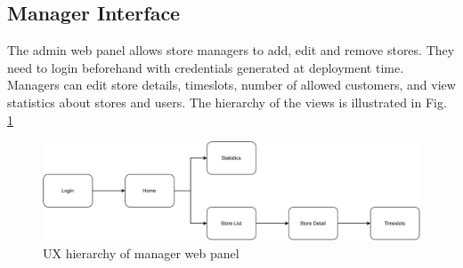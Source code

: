 \subsection{Manager Interface}

The admin web panel allows store managers to add, edit and remove stores.
They need to login beforehand with credentials generated at deployment time.
Managers can edit store details, timeslots, number of allowed customers, and view statistics about stores and users. The hierarchy of the views is illustrated in Fig. \ref{fig:ux_manager}


\begin{figure}[H]
    \includegraphics[width=\linewidth]{images/draw.io/ux_manager.pdf}
    \caption{UX hierarchy of manager web panel}
    \label{fig:ux_manager}
\end{figure}